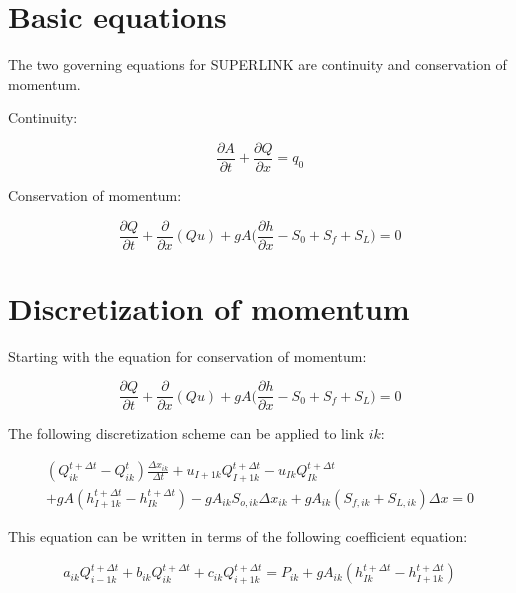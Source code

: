 \documentclass[11pt]{article}
\begin{document}
\section{Basic equations}

The two governing equations for SUPERLINK are continuity and conservation of momentum.

Continuity:

\begin{equation}
  \frac{\partial A}{\partial t} + \frac{\partial Q}{\partial x} = q_0
\end{equation}

Conservation of momentum:

\begin{equation}
  \frac{\partial Q}{\partial t} + \frac{\partial}{\partial x} (Q u) + g A \biggl(\frac{\partial h}{\partial x} - S_0 + S_f + S_L \biggr) = 0
\end{equation}

\section{Discretization of momentum}

Starting with the equation for conservation of momentum:

\begin{equation}
  \frac{\partial Q}{\partial t} + \frac{\partial}{\partial x} (Q u) + g A \biggl(\frac{\partial h}{\partial x} - S_0 + S_f + S_L \biggr) = 0
\end{equation}

The following discretization scheme can be applied to link $ik$:

\begin{equation}
  \begin{split}
    (Q_{ik}^{t + \Delta t} - Q_{ik}^t) \frac{\Delta x_{ik}}{\Delta t} + u_{I+1k}
    Q_{I + 1k}^{t + \Delta t} - u_{Ik} Q_{Ik}^{t + \Delta t} \\
    + g A (h_{I+1k}^{t + \Delta t} - h_{Ik}^{t + \Delta t}) 
    - g A_{ik} S_{o,ik} \Delta x_{ik} + g
    A_{ik} (S_{f,ik} + S_{L,ik}) \Delta x = 0
  \end{split}
\end{equation}

This equation can be written in terms of the following coefficient equation:

\begin{equation}
  \boxed{
  \begin{split}
    a_{ik} Q_{i - 1k}^{t + \Delta t} + b_{ik} Q_{ik}^{t + \Delta t} + c_{ik} Q_{i + 1k}^{t + \Delta t} =
    P_{ik} + g A_{ik} (h_{Ik}^{t + \Delta t} - h_{I+1k}^{t + \Delta t})
  \end{split}
  }
\end{equation}
\end{document}
